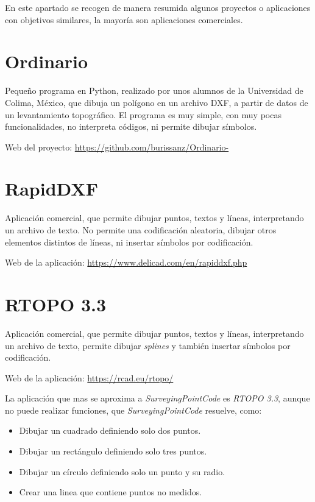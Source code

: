 
En este apartado se recogen de manera resumida algunos proyectos o aplicaciones con objetivos similares, la mayoría son aplicaciones comerciales.

\section{Ordinario}

Pequeño programa en Python, realizado por unos alumnos de la Universidad de Colima, México, que dibuja un polígono en un archivo DXF, a partir de datos de un levantamiento topográfico. El programa es muy simple, con muy pocas funcionalidades, no interpreta códigos, ni permite dibujar símbolos. 

Web del proyecto: \url{https://github.com/burissanz/Ordinario-}


\section{RapidDXF}

Aplicación comercial, que permite dibujar puntos, textos y líneas, interpretando un archivo de texto. No permite una codificación aleatoria, dibujar otros elementos distintos de líneas, ni insertar símbolos por codificación.

Web de la aplicación: \url{https://www.delicad.com/en/rapiddxf.php}


\section{RTOPO 3.3}
Aplicación comercial, que permite dibujar puntos, textos y líneas, interpretando un archivo de texto, permite dibujar \emph{splines} y también insertar símbolos por codificación.

Web de la aplicación: \url{https://rcad.eu/rtopo/}

La aplicación que mas se aproxima a \emph{SurveyingPointCode} es \emph{RTOPO 3.3}, aunque no puede realizar funciones, que \emph{SurveyingPointCode} resuelve, como:
\begin{itemize}
\item Dibujar un cuadrado definiendo solo dos puntos.
\item Dibujar un rectángulo definiendo solo tres puntos.
\item Dibujar un círculo definiendo solo un punto y su radio.
\item Crear una linea que contiene puntos no medidos.
\end{itemize}


